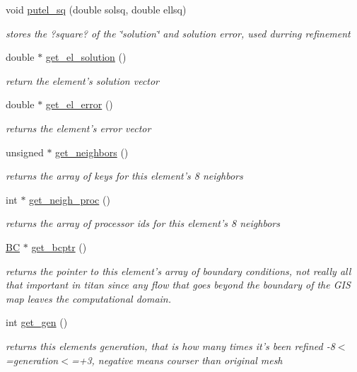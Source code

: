 \begin{CompactItemize}
void \hyperlink{classElement_a25}{putel\_\-sq} (double solsq, double ellsq)
\begin{CompactList}\small\item\em stores the ?square? of the \char`\"{}solution\char`\"{} and solution error, used durring refinement \item\end{CompactList}\item 
double $\ast$ \hyperlink{classElement_a26}{get\_\-el\_\-solution} ()
\begin{CompactList}\small\item\em return the element's solution vector \item\end{CompactList}\item 
double $\ast$ \hyperlink{classElement_a27}{get\_\-el\_\-error} ()
\begin{CompactList}\small\item\em returns the element's error vector \item\end{CompactList}\item 
unsigned $\ast$ \hyperlink{classElement_a28}{get\_\-neighbors} ()
\begin{CompactList}\small\item\em returns the array of keys for this element's 8 neighbors \item\end{CompactList}\item 
int $\ast$ \hyperlink{classElement_a29}{get\_\-neigh\_\-proc} ()
\begin{CompactList}\small\item\em returns the array of processor ids for this element's 8 neighbors \item\end{CompactList}\item 
\hyperlink{structBC}{BC} $\ast$ \hyperlink{classElement_a30}{get\_\-bcptr} ()
\begin{CompactList}\small\item\em returns the pointer to this element's array of boundary conditions, not really all that important in titan since any flow that goes beyond the boundary of the GIS map leaves the computational domain. \item\end{CompactList}\item 
int \hyperlink{classElement_a31}{get\_\-gen} ()
\begin{CompactList}\small\item\em returns this elements generation, that is how many times it's been refined -8$<$=generation$<$=+3, negative means courser than original mesh \item\end{CompactList}\item 

\end{CompactItemize}

